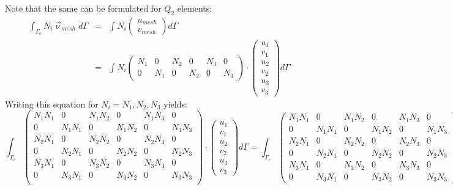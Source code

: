 Note that the same can be formulated for $Q_2$ elements:
\begin{eqnarray}
\int_{\Gamma_e} N_i \vec{\upnu}_{mesh} d\Gamma
&=& \int N_i \left( \begin{array}{c} u_{mesh} \\ v_{mesh} \end{array} \right) d\Gamma \\
&=& \int N_i 
\left( \begin{array}{cccccc}  
N_1 & 0 & N_2 & 0 & N_3 & 0\\ 
0 & N_1 & 0 & N_2 & 0 & N_3 
\end{array}\right)\cdot
\left( \begin{array}{c} u_1 \\ v_1 \\ u_2 \\ v_2 \\ u_3 \\ v_3 \end{array} \right) d\Gamma 
\end{eqnarray}
Writing this equation for $N_i=N_1,N_2,N_3$ yields:
\[
\int_{\Gamma_e} 
\left( \begin{array}{cccccc}  
N_1N_1 & 0 & N_1N_2 & 0 & N_1N_3 & 0 \\ 
0 & N_1N_1 & 0 & N_1N_2 & 0 & N_1N_3 \\
N_2N_1 & 0 & N_2N_2 & 0 & N_2N_3 & 0 \\ 
0 & N_2N_1 & 0 & N_2N_2 & 0 & N_2N_3 \\
N_3N_1 & 0 & N_3N_2 & 0 & N_3N_3 & 0 \\ 
0 & N_3N_1 & 0 & N_3N_2 & 0 & N_3N_3 \\
\end{array}\right)
\cdot \left( \begin{array}{c} u_1 \\ v_1 \\ u_2 \\ v_2 \\ u_3 \\ v_3 \end{array} \right) 
d\Gamma 
=
\int_{\Gamma_e} 
\left( \begin{array}{cccccc}  
N_1N_1 & 0 & N_1N_2 & 0 & N_1N_3 & 0 \\ 
0 & N_1N_1 & 0 & N_1N_2 & 0 & N_1N_3 \\
N_2N_1 & 0 & N_2N_2 & 0 & N_2N_3 & 0 \\ 
0 & N_2N_1 & 0 & N_2N_2 & 0 & N_2N_3 \\
N_3N_1 & 0 & N_3N_2 & 0 & N_3N_3 & 0 \\ 
0 & N_3N_1 & 0 & N_3N_2 & 0 & N_3N_3 
\end{array}\right)
d\Gamma \quad 
\cdot \left( \begin{array}{c} u_1 \\ v_1 \\ u_2 \\ v_2 \\ u_3 \\ v_3 \end{array} \right) 
\]

